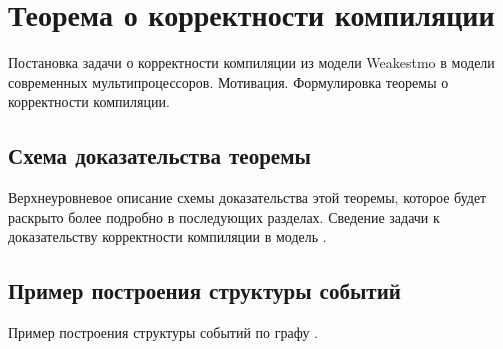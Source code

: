 \section{Теорема о корректности компиляции}

Постановка задачи о корректности компиляции из модели Weakestmo в
модели современных мультипроцессоров. Мотивация. Формулировка теоремы о
корректности компиляции.

\subsection{Схема доказательства теоремы}

Верхнеуровневое описание схемы доказательства этой теоремы,
которое будет раскрыто более подробно в последующих разделах.
Сведение задачи к доказательству корректности компиляции в модель \IMM.

\subsection{Пример построения структуры событий}

Пример построения структуры событий по графу \IMM.
